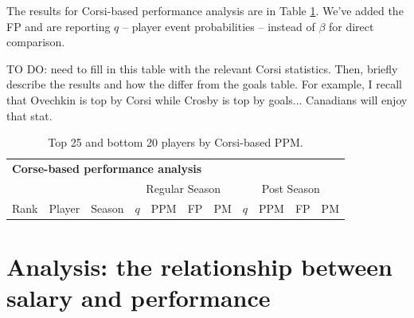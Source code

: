 The results for Corsi-based performance analysis are in Table \ref{tab:corsi}.
We've added the FP and are reporting $q$ -- player event probabilities --
instead of $\beta$ for direct comparison.

{\color{red} TO DO: need to fill in this table with the relevant Corsi statistics.  Then, briefly describe the results and how the differ from the goals table.  For example, I recall that Ovechkin is top by Corsi while Crosby is top by goals... Canadians will enjoy that stat.  }

\begin{table}[p]
        \centering\small
        \begin{tabular}{r c c r r r r r r r r }
        \multicolumn{11}{l}{\bf Corse-based performance analysis}\\
            & & & \multicolumn{4}{|c}{Regular Season} & \multicolumn{4}{|c}{Post Season}\\
            Rank & Player & Season  & \multicolumn{1}{|c}{$q$} & PPM & FP & PM & \multicolumn{1}{|c}{$q$} & PPM & FP & PM  \\ \hline
\end{tabular}
\caption{\label{tab:corsi} Top 25 and bottom 20 players by Corsi-based PPM.}
\end{table}

\section{Analysis: the relationship between salary and performance}
\label{sec:salary}

